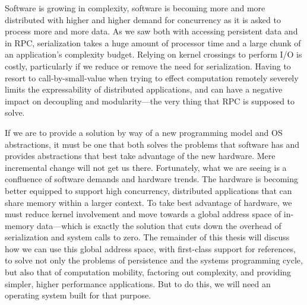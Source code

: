 \begin{chconc}

    Software is growing in complexity, software is becoming more and more distributed with higher and higher demand for
    concurrency as it is asked to process more and more data.
    As we saw both with accessing persistent data and in RPC, serialization takes a huge amount of processor time and a
    large chunk of an application's complexity budget. Relying on kernel crossings to perform I/O is costly, particularly if
    we reduce or remove the need for serialization. Having to resort to call-by-small-value when trying to effect
    computation remotely severely limits the expressability of distributed applications, and can have a negative impact on
    decoupling and modularity---the very thing that RPC is supposed to solve.

    If we are to provide a solution by way of a new programming model and OS abstractions, it must be one that both solves
    the problems that software has and provides abstractions that best take advantage of the new hardware. Mere incremental
    change will not get us there. Fortunately, what we are seeing is a confluence of software demands and hardware trends.
    The hardware is becoming better equipped to support high concurrency, distributed applications that can share memory
    within a larger context. To take best advantage of hardware, we must reduce kernel involvement and move towards a global
    address space of in-memory data---which is exactly the solution that cuts down the overhead of serialization and system calls
    to zero. The remainder of this thesis will discuss how we can use this global address space, with first-class support
    for references, to solve not only the problems of persistence and the systems programming cycle, but also that of
    computation mobility, factoring out complexity, and providing simpler, higher performance applications. But to do
    this, we will need an operating system built for that purpose.

\end{chconc}